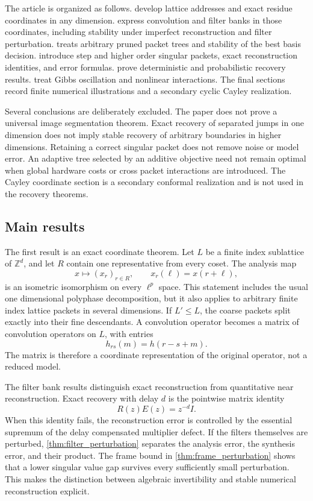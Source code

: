 \documentclass{aomart}
\theoremstyle{definition}
\theoremstyle{remark}
\newcommand{\ZZ}{\mathbb Z}
\begin{document}
The article is organized as follows.  develop lattice addresses and exact residue coordinates in any dimension.  express convolution and filter banks in those coordinates, including stability under imperfect reconstruction and filter perturbation.  treats arbitrary pruned packet trees and stability of the best basis decision.  introduce step and higher order singular packets, exact reconstruction identities, and error formulas.  prove deterministic and probabilistic recovery results.  treat Gibbs oscillation and nonlinear interactions. The final sections record finite numerical illustrations and a secondary cyclic Cayley realization.

Several conclusions are deliberately excluded. The paper does not prove a universal image segmentation theorem. Exact recovery of separated jumps in one dimension does not imply stable recovery of arbitrary boundaries in higher dimensions. Retaining a correct singular packet does not remove noise or model error. An adaptive tree selected by an additive objective need not remain optimal when global hardware costs or cross packet interactions are introduced. The Cayley coordinate section is a secondary conformal realization and is not used in the recovery theorems.

\subsection{Main results}

The first result is an exact coordinate theorem. Let \(L\) be a finite index sublattice of \(\ZZ^d\), and let \(R\) contain one representative from every coset. The analysis map
\[
x\longmapsto (x_r)_{r\in R},
\qquad
x_r(\ell)=x(r+\ell),
\]
is an isometric isomorphism on every \(\ell^p\) space. This statement includes the usual one dimensional polyphase decomposition, but it also applies to arbitrary finite index lattice packets in several dimensions. If \(L'\leq L\), the coarse packets split exactly into their fine descendants. A convolution operator becomes a matrix of convolution operators on \(L\), with entries
\[
h_{rs}(m)=h(r-s+m).
\]
The matrix is therefore a coordinate representation of the original operator, not a reduced model.

The filter bank results distinguish exact reconstruction from quantitative near reconstruction. Exact recovery with delay \(d\) is the pointwise matrix identity
\[
R(z)E(z)=z^{-d}I.
\]
When this identity fails, the reconstruction error is controlled by the essential supremum of the delay compensated multiplier defect. If the filters themselves are perturbed, \cref{thm:filter_perturbation} separates the analysis error, the synthesis error, and their product. The frame bound in \cref{thm:frame_perturbation} shows that a lower singular value gap survives every sufficiently small perturbation. This makes the distinction between algebraic invertibility and stable numerical reconstruction explicit.
\end{document}
